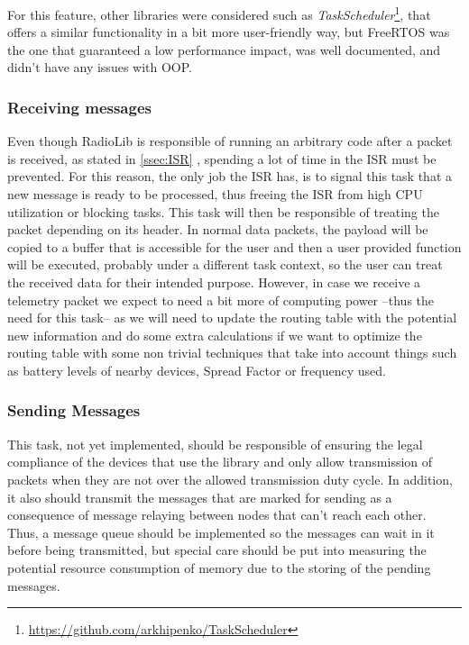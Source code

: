 For this feature, other libraries were considered such as \textit{TaskScheduler}\footnote{\url{https://github.com/arkhipenko/TaskScheduler}}, that offers a similar functionality in a bit more user-friendly way, but FreeRTOS was the one that guaranteed a low performance impact, was well documented, and didn't have any issues with OOP.

\subsubsection*{Receiving messages}
Even though RadioLib is responsible of running an arbitrary code after a packet is received, as stated in \ref{ssec:ISR}
, spending a lot of time in the ISR must be prevented. For this reason, the only job the ISR has, is to signal this task that a new message is ready to be processed, thus freeing the ISR from high CPU utilization or blocking tasks. This task will then be responsible of treating the packet depending on its header. In normal data packets, the payload will be copied to a buffer that is accessible for the user and then a user provided function will be executed, probably under a different task context, so the user can treat the received data for their intended purpose. However, in case we receive a telemetry packet we expect to need a bit more of computing power --thus the need for this task-- as we will need to update the routing table with the potential new information and do some extra calculations if we want to optimize the routing table with some non trivial techniques that take into account things such as battery levels of nearby devices, Spread Factor or frequency used.

\subsubsection*{Sending Messages}
\label{ssec:Sending}
This task, not yet implemented, should be responsible of ensuring the legal compliance of the devices that use the library and only allow transmission of packets when they are not over the allowed transmission duty cycle. In addition, it also should transmit the messages that are marked for sending as a consequence of message relaying between nodes that can't reach each other. Thus, a message queue should be implemented so the messages can wait in it before being transmitted, but special care should be put into measuring the potential resource consumption of memory due to the storing of the pending messages.
